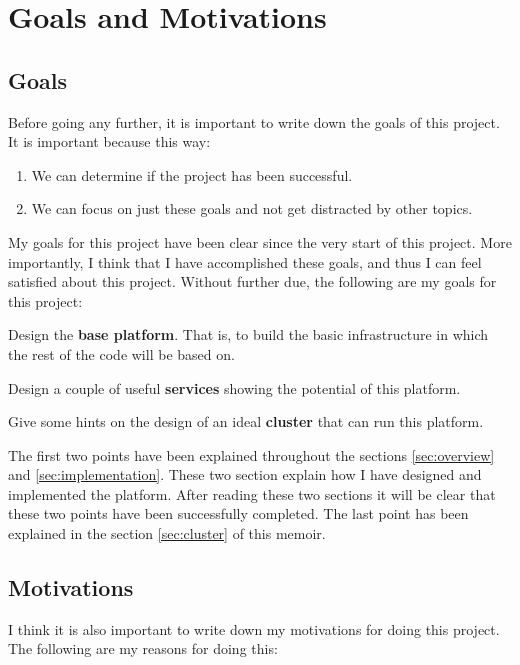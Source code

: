 
\section{Goals and Motivations}

\subsection{Goals}

Before going any further, it is important to write down the goals of this
project. It is important because this way:

\begin{enumerate}
  \itemsep0em
  \item We can determine if the project has been successful.
  \item We can focus on just these goals and not get distracted by other topics.
\end{enumerate}

My goals for this project have been clear since the very start of this project.
More importantly, I think that I have accomplished these goals, and thus I can
feel satisfied about this project. Without further due, the following are my
goals for this project:

\mylist
  \item Design the {\bf base platform}. That is, to build the basic
infrastructure in which the rest of the code will be based on.
  \item Design a couple of useful {\bf services} showing the potential of this
platform.
  \item Give some hints on the design of an ideal {\bf cluster} that can run
this platform.
\mylistend

The first two points have been explained throughout the sections
\ref{sec:overview} and \ref{sec:implementation}. These two section explain
how I have designed and implemented the platform. After reading these two
sections it will be clear that these two points have been successfully
completed. The last point has been explained in the section \ref{sec:cluster}
of this memoir.

\subsection{Motivations}

I think it is also important to write down my motivations for doing this
project. The following are my reasons for doing this:

